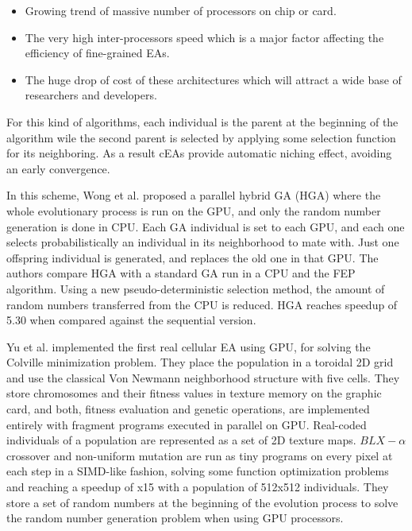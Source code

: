 \documentclass[prodmode,acmtecs]{acmsmall}
\begin{document}
\begin{itemize}
 \item Growing trend of massive number of processors on chip or card. 
\item The very high inter-processors speed which is a major factor affecting the efficiency of fine-grained EAs. 
\item The huge drop of cost of these architectures which will attract a wide base of researchers and developers.
\end{itemize}

For this kind of algorithms, each individual is the parent at the beginning of the algorithm wile the second parent is selected by applying some selection function for its neighboring. As a result cEAs provide automatic niching effect, avoiding an early convergence. 


In this scheme, Wong et al. \cite{man-leung-wong-parallel-2006,wong-implementation-2009} proposed a parallel hybrid GA (HGA) where the whole evolutionary process is run on the GPU, and only the random number generation is done in CPU. Each GA individual is set to each GPU, and each one selects probabilistically an individual in its neighborhood to mate with. Just one offspring individual is generated, and replaces the old one in that GPU. The authors compare HGA with a standard GA run in a CPU and the FEP \cite{man-leung-wong-parallel-2005} algorithm. Using a new pseudo-deterministic selection method, the amount of random numbers transferred from the CPU is reduced. HGA reaches speedup of 5.30 when compared against the sequential version.




Yu et al. \cite{yu-parallel-2005} implemented the first real cellular EA using GPU, for solving the Colville minimization problem. They place the population in a toroidal 2D grid and use the classical Von Newmann neighborhood structure with five cells. They store chromosomes and their fitness values in texture memory on the graphic card, and both, fitness evaluation and genetic operations, are implemented entirely with fragment programs executed in parallel on GPU. Real-coded individuals of a population are represented as a set of 2D texture maps. $BLX-\alpha$ crossover and non-uniform mutation are run as tiny programs on every pixel at each step in a SIMD-like fashion, solving some function optimization problems and reaching a speedup of x15 with a population of 512x512 individuals. They store a set of random numbers at the beginning of the evolution process to solve the random number generation problem when using GPU processors. 
\end{document}
